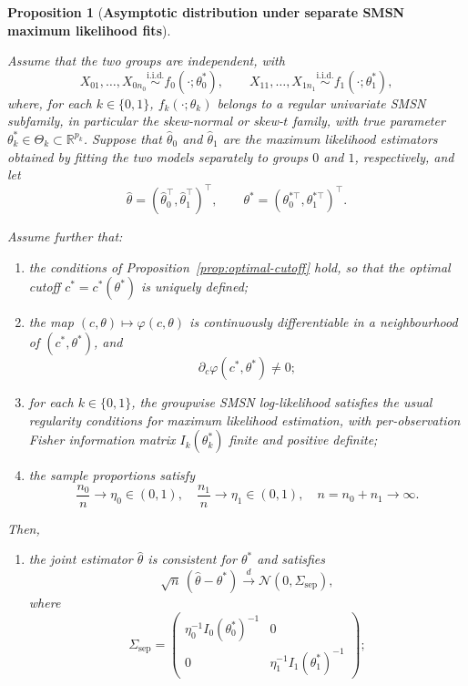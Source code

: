\documentclass[11pt,a4paper]{article}
\newtheorem{proposition}[theorem]{Proposition}
\theoremstyle{definition}
\theoremstyle{remark}
\newcommand{\1}{\mathbf{1}}
\begin{document}
\begin{proposition}[\textbf{Asymptotic distribution under separate SMSN maximum likelihood fits}]
\label{prop:separate-mle}

Assume that the two groups are independent, with
\[
X_{01},\ldots,X_{0n_0}\stackrel{\mathrm{i.i.d.}}{\sim} f_0(\cdot;\theta_0^*),
\qquad
X_{11},\ldots,X_{1n_1}\stackrel{\mathrm{i.i.d.}}{\sim} f_1(\cdot;\theta_1^*),
\]
where, for each $k\in\{0,1\}$, $f_k(\cdot;\theta_k)$ belongs to a regular
univariate SMSN subfamily, in particular the skew-normal or skew-$t$
family, with true parameter
$\theta_k^*\in\Theta_k\subset\mathbb R^{p_k}$.
Suppose that $\hat\theta_0$ and $\hat\theta_1$ are the maximum
likelihood estimators obtained by fitting the two models separately to
groups $0$ and $1$, respectively, and let
\[
\hat\theta=(\hat\theta_0^\top,\hat\theta_1^\top)^\top,
\qquad
\theta^*=(\theta_0^{*\top},\theta_1^{*\top})^\top.
\]

\noindent
Assume further that:
\begin{enumerate}
\item the conditions of Proposition~\ref{prop:optimal-cutoff} hold, so that the optimal cutoff $c^*=c^*(\theta^*)$ is uniquely defined;
\item the map $(c,\theta)\mapsto\varphi(c,\theta)$ is continuously differentiable in a neighbourhood of $(c^*,\theta^*)$, and
\[
\partial_c\varphi(c^*,\theta^*)\neq 0;
\]
\item for each $k\in\{0,1\}$, the groupwise SMSN log-likelihood satisfies the usual regularity conditions for maximum likelihood estimation, with per-observation Fisher information matrix $I_k(\theta_k^*)$ finite and positive definite;
\item the sample proportions satisfy
\[
\frac{n_0}{n}\to\eta_0\in(0,1),
\quad
\frac{n_1}{n}\to\eta_1\in(0,1),
\quad
n=n_0+n_1\to\infty.
\]
\end{enumerate}
Then,
\begin{enumerate}
\item the joint estimator $\hat\theta$ is consistent for $\theta^*$ and satisfies
\begin{equation}
\label{eq:joint-an-separate}
\sqrt{n}\,(\hat\theta-\theta^*)
\stackrel{d}{\longrightarrow}
\mathcal N(0,\Sigma_{\mathrm{sep}}),
\end{equation}
where
\begin{equation}
\label{eq:sigma-sep}
\Sigma_{\mathrm{sep}}
=
\begin{pmatrix}
\eta_0^{-1}I_0(\theta_0^*)^{-1} & 0\\[0.4em]
0 & \eta_1^{-1}I_1(\theta_1^*)^{-1}
\end{pmatrix};
\end{equation}


\end{enumerate}
\end{proposition}
\end{document}
